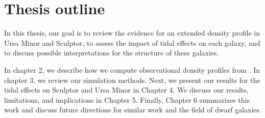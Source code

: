 \section{Thesis outline}\label{thesis-outline}

In this thesis, our goal is to review the evidence for an extended
density profile in Ursa Minor and Sculptor, to assess the impact of
tidal effects on each galaxy, and to discuss possible interpretations
for the structure of these galaxies.

In chapter 2, we describe how we compute observational density profiles
from \citet{jensen+2024}. In chapter 3, we review our simulation
methods. Next, we present our results for the tidal effects on Sculptor
and Ursa Minor in Chapter 4. We discuss our results, limitations, and
implications in Chapter 5. Finally, Chapter 6 summarizes this work and
discuss future directions for similar work and the field of dwarf
galaxies.

